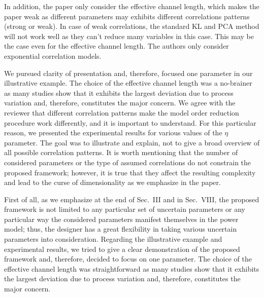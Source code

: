 \begin{reviewer}
In addition, the paper only consider the effective channel length, which makes the paper weak as different parameters may exhibits different correlations patterns (strong or weak). In case of weak correlations, the standard KL and PCA method will not work well as they can’t reduce many variables in this case. This may be the case even for the effective channel length. The authors only consider exponential correlation models.
\end{reviewer}
\begin{authors}
We pursued clarity of presentation and, therefore, focused one parameter in our illustrative example.
The choice of the effective channel length was a no-brainer as many studies show that it exhibits the largest deviation due to process variation and, therefore, constitutes the major concern.
We agree with the reviewer that different correlation patterns make the model order reduction procedure work differently, and it is important to understand.
For this particular reason, we presented the experimental results for various values of the $\eta$ parameter.
The goal was to illustrate and explain, not to give a broad overview of all possible correlation patterns.
It is worth mentioning that the number of considered parameters or the type of assumed correlations do not constrain the proposed framework; however, it is true that they affect the resulting complexity and lead to the curse of dimensionality as we emphasize in the paper.

First of all, as we emphasize at the end of Sec.~III and in Sec.~VIII, the proposed framework is not limited to any particular set of uncertain parameters or any particular way the considered parameters manifest themselves in the power model; thus, the designer has a great flexibility in taking various uncertain parameters into consideration.
Regarding the illustrative example and experimental results, we tried to give a clear demonstration of the proposed framework and, therefore, decided to focus on one parameter.
The choice of the effective channel length was straightforward as many studies show that it exhibits the largest deviation due to process variation and, therefore, constitutes the major concern.
\end{authors}

